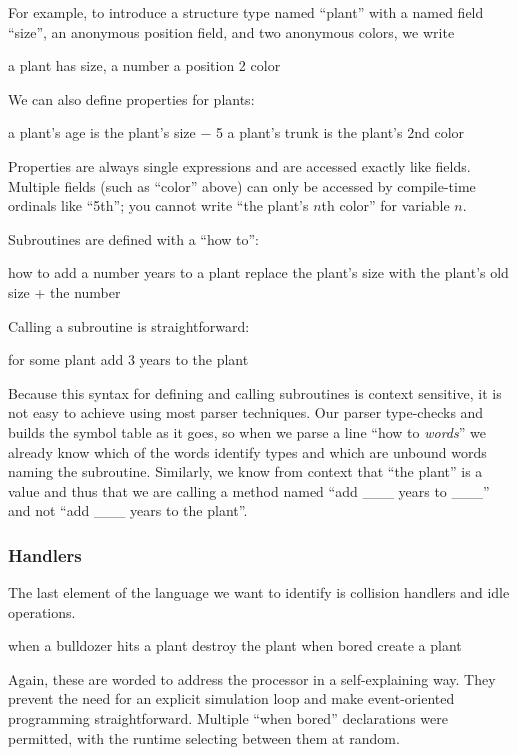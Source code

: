 \documentclass{sig-alternate}
\newcommand{\INDSTATE}[1][1]{\STATE\hspace{#1\algorithmicindent}}
\newenvironment{snippet}{\begin{algorithmic}\sf}{\end{algorithmic}}
\newcommand{\code}[1]{``\textsf{#1}''}
\begin{document}
For example, to introduce a structure type named ``plant''
with a named field ``size'', an anonymous position field, and two anonymous colors,
we write
\begin{snippet}
\STATE a plant has
\INDSTATE size, a number
\INDSTATE a position
\INDSTATE 2 color
\end{snippet}
We can also define properties for plants:
\begin{snippet}
\STATE a plant's age is the plant's size $-$ 5
\STATE a plant's trunk is the plant's 2nd color
\end{snippet}
Properties are always single expressions and are accessed exactly like fields.
Multiple fields (such as \code{color} above) can only be accessed by compile-time ordinals like \code{5th};
you cannot write \code{the plant's $n$th color} for variable $n$.

Subroutines are defined with a ``how to'':
\begin{snippet}
\STATE how to add a number years to a plant
\INDSTATE replace the plant's size with the plant's old size + the number
\end{snippet}
Calling a subroutine is straightforward:
\begin{snippet}
\STATE for some plant
\INDSTATE add 3 years to the plant
\end{snippet}
Because this syntax for defining and calling subroutines
is context sensitive, it is not easy to achieve using most parser techniques.
Our parser type-checks and builds the symbol table as it goes,
so when we parse a line \code{how to {\it words}}
we already know which of the words identify types and which are unbound words naming the subroutine.
Similarly, we know from context that \code{the plant} is a value
and thus that we are calling a method named ``add \_\_\_ years to \_\_\_'' and not ``add \_\_\_ years to the plant''.

\subsubsection{Handlers}
The last element of the language we want to identify
is collision handlers and idle operations.
\begin{snippet}
\STATE when a bulldozer hits a plant
\INDSTATE destroy the plant
\STATE when bored
\INDSTATE create a plant
\end{snippet}
Again, these are worded to address the processor in a self-explaining way.
They prevent the need for an explicit simulation loop
and make event-oriented programming straightforward.
Multiple \code{when bored} declarations were permitted,
with the runtime selecting between them at random.
\end{document}
